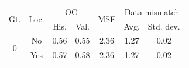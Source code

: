\begin{tabular}{ccccccc}
\toprule
\multirow{2}{*}{
    Gt.
}
&
\multirow{2}{*}{Loc.} 
& 
\multicolumn{2}{c}{OC} & 
\multirow{2}{*}{
    MSE
} & 
\multicolumn{2}{c}{Data mismatch} 
\\
& & His. & Val. &  & Avg. & Std. dev.
\\
\midrule
\multirow{2}{*}{0} & No & 0.56 & 0.55 & 2.36 & 1.27 & 0.02 \\
 & Yes & 0.57 & 0.58 & 2.36 & 1.27 & 0.02 \\
\bottomrule
\end{tabular}
